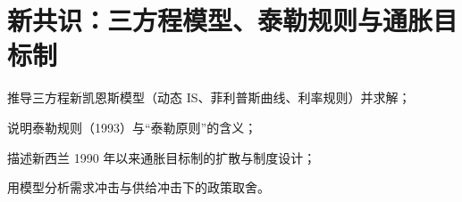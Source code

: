 \chapter{新共识：三方程模型、泰勒规则与通胀目标制}\label{ch:consensus}

\begin{chapterguide}
\begin{guidegoals}
\item 推导三方程新凯恩斯模型（动态 IS、菲利普斯曲线、利率规则）并求解；
\item 说明泰勒规则（1993）与“泰勒原则”的含义；
\item 描述新西兰 1990 年以来通胀目标制的扩散与制度设计；
\item 用模型分析需求冲击与供给冲击下的政策取舍。
\end{guidegoals}
\end{chapterguide}

\chapterstub
